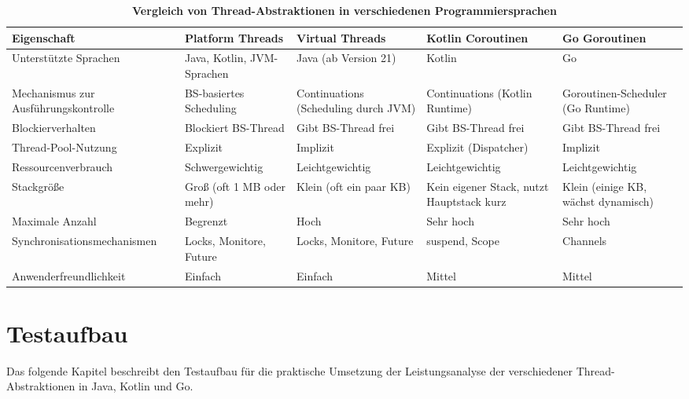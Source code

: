 \documentclass[fontsize=12pt,paper=a4,twoside=semi,parskip=half-,headsepline,headinclude]{scrreprt}
\begin{document}
\begin{table}[h]
	\centering
	\renewcommand{\arraystretch}{1.2}
	\begin{tabularx}{\textwidth}{p{4cm}XXXX}
		\toprule
		\rowcolor{gray!20}
		\textbf{Eigenschaft} & \textbf{Platform Threads} & \textbf{Virtual Threads} & \textbf{Kotlin Coroutinen} & \textbf{Go Goroutinen} \\
		\midrule
		\raggedright Unterstützte Sprachen & Java, Kotlin, JVM-Sprachen & Java (ab Version 21) & Kotlin & Go \\
		\rowcolor{gray!10}
		\raggedright Mechanismus zur Ausführungskontrolle & BS-basiertes Scheduling & Continuations (Scheduling durch JVM) & Continuations (Kotlin Runtime) & Goroutinen-Scheduler (Go Runtime) \\
		\raggedright Blockierverhalten & Blockiert BS-Thread & Gibt BS-Thread frei & Gibt BS-Thread frei & Gibt BS-Thread frei \\
		\rowcolor{gray!10}
		\raggedright Thread-Pool-Nutzung & Explizit & Implizit & Explizit (Dispatcher) & Implizit \\
		\raggedright Ressourcenverbrauch & Schwer\-gewichtig & Leicht\-gewichtig & Leicht\-gewichtig & Leicht\-gewichtig \\
		\rowcolor{gray!10}
		\raggedright Stackgröße & Groß (oft 1 MB oder mehr) & Klein (oft ein paar KB) & Kein eigener Stack, nutzt Hauptstack kurz & Klein (einige KB, wächst dynamisch) \\
		\raggedright Maximale Anzahl & Begrenzt & Hoch & Sehr hoch & Sehr hoch \\
		\rowcolor{gray!10}
		\raggedright Synchronisations\-mechanismen & Locks, Monitore, Future & Locks, Monitore, Future & suspend, Scope & Channels \\
		\raggedright Anwender\-freundlichkeit & Einfach & Einfach & Mittel & Mittel \\
		\bottomrule
	\end{tabularx}
	\caption{\textbf{Vergleich von Thread-Abstraktionen in verschiedenen Programmiersprachen}}
	\label{tab:thread-comparison}
\end{table}


\chapter{Testaufbau}

Das folgende Kapitel beschreibt den Testaufbau für die praktische Umsetzung der Leistungsanalyse der verschiedener Thread-Abstraktionen in Java, Kotlin und Go. 
\end{document}
